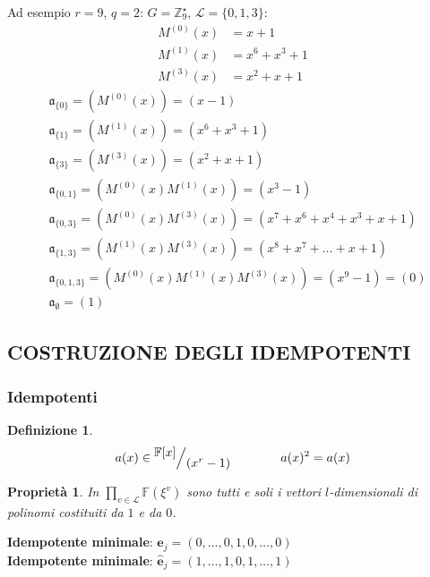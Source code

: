 \documentclass[mathserif]{beamer}
\def\quotient#1#2{%
   \raise1ex\hbox{$#1$}\Big/\lower1ex\hbox{$#2$}%
}
\newtheorem{definizione}{Definizione}
\newtheorem{prop}{Proprietà}
\begin{document}
\thispagestyle{empty}
\begin{frame}
   \vspace{-1.3cm}
     Ad esempio $r = 9$, $q = 2$: $ G = \mathbb{Z}_{9}^{\star} $, $\mathscr{L} = \lbrace 0,1,3 \rbrace$:
      \begin{align*}
	  M^{(0)}(x) &= x+1 \\
	  M^{(1)}(x) &= x^6+x^3+1 \\ 
	  M^{(3)}(x) &= x^2+x+1 
      \end{align*}
      \begin{align*}
	  &\mathfrak{a}_{\lbrace 0 \rbrace} = (M^{(0)}(x)) = (x-1) \\
	  &\mathfrak{a}_{\lbrace 1 \rbrace} = (M^{(1)}(x)) = (x^6+x^3+1) \\
	  &\mathfrak{a}_{\lbrace 3 \rbrace} = (M^{(3)}(x)) = (x^2+x+1) \\
	  &\mathfrak{a}_{\lbrace 0,1 \rbrace} = (M^{(0)}(x)M^{(1)}(x)) = (x^3 -1) \\
	  &\mathfrak{a}_{\lbrace 0,3 \rbrace} = (M^{(0)}(x)M^{(3)}(x)) = (x^7 + x^6 + x^4 + x^3 + x + 1) \\
	  &\mathfrak{a}_{\lbrace 1,3 \rbrace} 
			= (M^{(1)}(x)M^{(3)}(x)) = (x^8 + x^7 + \dots + x + 1) \\
	  &\mathfrak{a}_{\lbrace 0,1,3 \rbrace} = (M^{(0)}(x)M^{(1)}(x)M^{(3)}(x)) = (x^9 -1) = (0) \\
	  &\mathfrak{a}_{\emptyset} = (1) 
      \end{align*}
\end{frame}


\subsection{COSTRUZIONE DEGLI IDEMPOTENTI}
\begin{frame}
  \frametitle{Idempotenti}
  \begin{definizione}
     $ $  %
     \begin{align*}
        a(x) \in \quotient{\mathbb{F} \lbrack x \rbrack  }{ (x^{r} - 1)} \qquad \qquad a(x)^2 = a(x)
     \end{align*}
  \end{definizione}
    \begin{prop}
      In $  \prod_{v\in \mathscr{L}} \mathbb{F}(\xi^{v})$ sono tutti e soli i vettori $l$-dimensionali di polinomi costituiti da $1$ e da $0$.
    \end{prop}
    {\bf Idempotente minimale}: $  \mathbf{e}_{j} = (0, \dots, 0,1,0, \dots, 0)$ \\
    {\bf Idempotente minimale}: $  \mathbf{\hat{e}}_{j} = (1, \dots, 1,0,1, \dots, 1)$ 
\end{frame}
\end{document}
